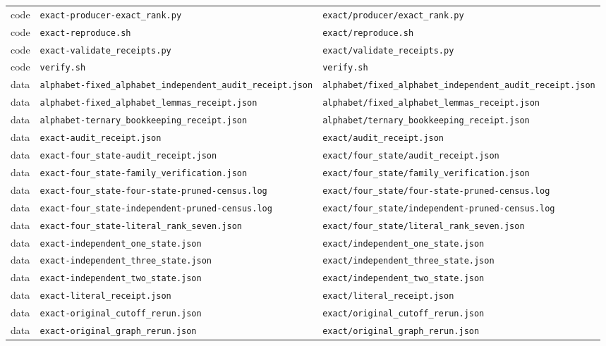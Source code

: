\documentclass[11pt,letterpaper]{article}
\theoremstyle{definition}
\theoremstyle{remark}
\begin{document}
{\begin{longtable}{@{}P{.06\textwidth}P{.46\textwidth}P{.42\textwidth}@{}}
code & \nolinkurl{exact-producer-exact_rank.py} & \nolinkurl{exact/producer/exact_rank.py}\\
code & \nolinkurl{exact-reproduce.sh} & \nolinkurl{exact/reproduce.sh}\\
code & \nolinkurl{exact-validate_receipts.py} & \nolinkurl{exact/validate_receipts.py}\\
code & \nolinkurl{verify.sh} & \nolinkurl{verify.sh}\\
data & \nolinkurl{alphabet-fixed_alphabet_independent_audit_receipt.json} & \nolinkurl{alphabet/fixed_alphabet_independent_audit_receipt.json}\\
data & \nolinkurl{alphabet-fixed_alphabet_lemmas_receipt.json} & \nolinkurl{alphabet/fixed_alphabet_lemmas_receipt.json}\\
data & \nolinkurl{alphabet-ternary_bookkeeping_receipt.json} & \nolinkurl{alphabet/ternary_bookkeeping_receipt.json}\\
data & \nolinkurl{exact-audit_receipt.json} & \nolinkurl{exact/audit_receipt.json}\\
data & \nolinkurl{exact-four_state-audit_receipt.json} & \nolinkurl{exact/four_state/audit_receipt.json}\\
data & \nolinkurl{exact-four_state-family_verification.json} & \nolinkurl{exact/four_state/family_verification.json}\\
data & \nolinkurl{exact-four_state-four-state-pruned-census.log} & \nolinkurl{exact/four_state/four-state-pruned-census.log}\\
data & \nolinkurl{exact-four_state-independent-pruned-census.log} & \nolinkurl{exact/four_state/independent-pruned-census.log}\\
data & \nolinkurl{exact-four_state-literal_rank_seven.json} & \nolinkurl{exact/four_state/literal_rank_seven.json}\\
data & \nolinkurl{exact-independent_one_state.json} & \nolinkurl{exact/independent_one_state.json}\\
data & \nolinkurl{exact-independent_three_state.json} & \nolinkurl{exact/independent_three_state.json}\\
data & \nolinkurl{exact-independent_two_state.json} & \nolinkurl{exact/independent_two_state.json}\\
data & \nolinkurl{exact-literal_receipt.json} & \nolinkurl{exact/literal_receipt.json}\\
data & \nolinkurl{exact-original_cutoff_rerun.json} & \nolinkurl{exact/original_cutoff_rerun.json}\\
data & \nolinkurl{exact-original_graph_rerun.json} & \nolinkurl{exact/original_graph_rerun.json}\\

\end{longtable}}
\end{document}
